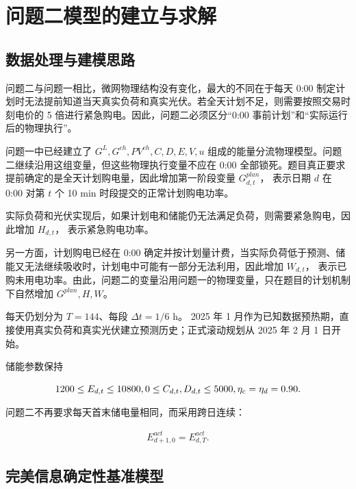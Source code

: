 \section{问题二模型的建立与求解}

\subsection{数据处理与建模思路}

问题二与问题一相比，微网物理结构没有变化，最大的不同在于每天 0:00 制定计划时无法提前知道当天真实负荷和真实光伏。若全天计划不足，则需要按照交易时刻电价的 5 倍进行紧急购电。因此，问题二必须区分“0:00 事前计划”和“实际运行后的物理执行”。

问题一中已经建立了 \(G^L,G^{ch},PV^{ch},C,D,E,V,u\) 组成的能量分流物理模型。问题二继续沿用这组变量，但这些物理执行变量不应在 0:00 全部锁死。题目真正要求提前确定的是全天计划购电量，因此增加第一阶段变量 \(G^{plan}_{d,t}\)， 表示日期 \(d\) 在 0:00 对第 \(t\) 个 10 min 时段提交的正常计划购电功率。

实际负荷和光伏实现后，如果计划电和储能仍无法满足负荷，则需要紧急购电，因此增加 \(H_{d,t}\)， 表示紧急购电功率。

另一方面，计划购电已经在 0:00 确定并按计划量计费，当实际负荷低于预测、储能又无法继续吸收时，计划电中可能有一部分无法利用，因此增加 \(W_{d,t}\)， 表示已购未用电功率。由此，问题二的变量沿用问题一的物理变量，只在题目的计划机制下自然增加 \(G^{plan},H,W\)。

每天仍划分为 \(T=144\)、每段 \(\Delta t=1/6\) h。 2025 年 1 月作为已知数据预热期，直接使用真实负荷和真实光伏建立预测历史；正式滚动规划从 2025 年 2 月 1 日开始。

储能参数保持

\[
1200\le E_{d,t}\le10800,\\
0\le C_{d,t},D_{d,t}\le5000,\\
\eta_c=\eta_d=0.90.
\]

问题二不再要求每天首末储电量相同，而采用跨日连续：

\begin{equation}
\begin{gathered}
E^{act}_{d+1,0}=E^{act}_{d,T}.
\end{gathered}
\end{equation}

\subsection{完美信息确定性基准模型}

